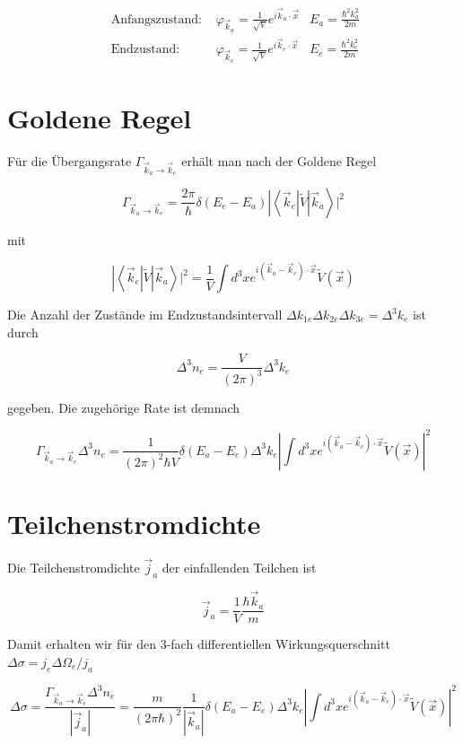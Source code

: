 \documentclass[10pt, letterpaper]{article}
\begin{document}
$$
\begin{array}{lll}
\text { Anfangszustand: } & \varphi_{\vec{k}_{a}}=\frac{1}{\sqrt{V}} e^{i \vec{k}_{a} \cdot \vec{x}} & E_{a}=\frac{\hbar^{2} k_{a}^{2}}{2 m} \\
\text { Endzustand: } & \varphi_{\vec{k}_{e}}=\frac{1}{\sqrt{V}} e^{i \vec{k}_{e} \cdot \vec{x}} & E_{e}=\frac{\hbar^{2} k_{e}^{2}}{2 m}
\end{array}
$$

\section*{Goldene Regel}
Für die Übergangsrate $\Gamma_{\vec{k}_{a} \rightarrow \vec{k}_{e}}$ erhält man nach der Goldene Regel

$$
\left.\Gamma_{\vec{k}_{a} \rightarrow \vec{k}_{e}}=\frac{2 \pi}{\hbar} \delta\left(E_{e}-E_{a}\right)\left|\left\langle\vec{k}_{e}\right| \tilde{V}\right| \vec{k}_{a}\right\rangle\left.\right|^{2}
$$

mit

$$
\left.\left|\left\langle\vec{k}_{e}\right| \tilde{V}\right| \vec{k}_{a}\right\rangle\left.\right|^{2}=\frac{1}{V} \int d^{3} x e^{i\left(\vec{k}_{a}-\vec{k}_{e}\right) \cdot \vec{x}} \tilde{V}(\vec{x})
$$

Die Anzahl der Zustände im Endzustandsintervall $\Delta k_{1 e} \Delta k_{2 e} \Delta k_{3 e}=\Delta^{3} k_{e}$ ist durch

$$
\Delta^{3} n_{e}=\frac{V}{(2 \pi)^{3}} \Delta^{3} k_{e}
$$

gegeben. Die zugehörige Rate ist demnach

$$
\Gamma_{\vec{k}_{a} \rightarrow \vec{k}_{e}} \Delta^{3} n_{e}=\frac{1}{(2 \pi)^{2} \hbar V} \delta\left(E_{a}-E_{e}\right) \Delta^{3} k_{e}\left|\int d^{3} x e^{i\left(\vec{k}_{a}-\vec{k}_{e}\right) \cdot \vec{x}} \tilde{V}(\vec{x})\right|^{2}
$$

\section*{Teilchenstromdichte}
Die Teilchenstromdichte $\vec{j}_{a}$ der einfallenden Teilchen ist

$$
\vec{j}_{a}=\frac{1}{V} \frac{\hbar \vec{k}_{a}}{m}
$$

Damit erhalten wir für den 3-fach differentiellen Wirkungsquerschnitt $\Delta \sigma=j_{e} \Delta \Omega_{e} / j_{a}$

$$
\Delta \sigma=\frac{\Gamma_{\vec{k}_{a} \rightarrow \vec{k}_{e}} \Delta^{3} n_{e}}{\left|\vec{j}_{a}\right|}=\frac{m}{(2 \pi \hbar)^{2}} \frac{1}{\left|\vec{k}_{a}\right|} \delta\left(E_{a}-E_{e}\right) \Delta^{3} k_{e}\left|\int d^{3} x e^{i\left(\vec{k}_{a}-\vec{k}_{e}\right) \cdot \vec{x}} \tilde{V}(\vec{x})\right|^{2}
$$
\end{document}
